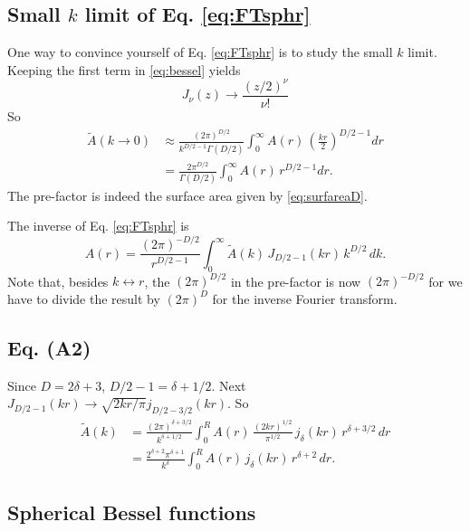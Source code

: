 \documentclass[preprint]{revtex4-1}
\numberwithin{equation}{subsection}
\numberwithin{table}{section}
\begin{document}
\subsection{Small $k$ limit of Eq. \eqref{eq:FTsphr}}



One way to convince yourself of Eq. \eqref{eq:FTsphr} is to study the small $k$ limit.
%
Keeping the first term in \eqref{eq:bessel} yields
\[
  J_\nu(z) \rightarrow \frac{ (z/2)^\nu }{ \nu! }
\]
So
%
\begin{align*}
\tilde A(k \rightarrow 0)
&\approx
\frac{ (2 \pi)^{D/2} } { k^{D/2 - 1} \Gamma(D/2) }
\int_0^\infty A(r) \, \left( \frac{k r}{2} \right)^{D/2 - 1} dr \\
&=
\frac{ 2 \pi^{D/2} } { \Gamma(D/2) }
\int_0^\infty A(r) \, r^{D/2 - 1} dr.
\end{align*}
%
The pre-factor is indeed the surface area
given by \eqref{eq:surfareaD}.


The inverse of Eq. \eqref{eq:FTsphr} is
\begin{equation}
A(r)
=
\frac{ (2\pi)^{-D/2} } { r^{D/2 - 1} }
\int_0^\infty \tilde{A}(k) \, J_{D/2-1}(kr) \, k^{D/2} \, dk.
\label{eq:invFTsphr}
\end{equation}
Note that, besides $k \leftrightarrow r$,
the $(2\pi)^{D/2}$ in the pre-factor is now $(2\pi)^{-D/2}$
for we have to divide the result by $(2\pi)^D$
for the inverse Fourier transform.



\subsection{Eq. (A2)}

Since $D = 2\delta + 3$, $D/2 - 1 = \delta + 1/2$.
%
Next $J_{D/2-1}(kr) \rightarrow \sqrt{2 k r/\pi} j_{D/2-3/2} (kr)$.
%
So
\begin{align*}
\tilde A(k)
&=
\frac{ (2 \pi)^{\delta + 3/2} } { k^{\delta + 1/2} }
\int_0^R
  A(r) \, \frac{ (2kr)^{1/2} } { \pi^{1/2} } \,
  j_\delta(k r) \, r^{\delta + 3/2}\, dr \\
&=
  \frac{ 2^{\delta + 2} \pi^{\delta + 1} } { k^\delta }
\int_0^R
  A(r) \, j_\delta(k r) \, r^{\delta + 2} \, dr.
\end{align*}



\subsection{Spherical Bessel functions}
\end{document}
